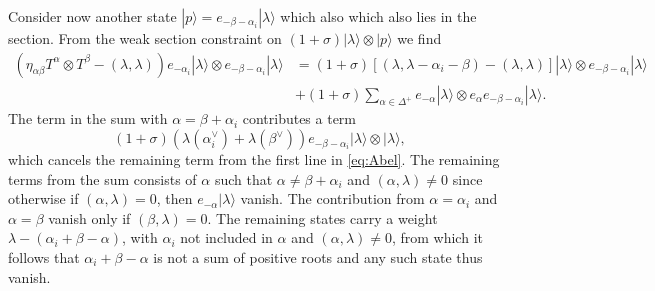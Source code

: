 Consider now another state $|p\rangle = e_{-\beta-\alpha_i}|\lambda\rangle$ which also which also lies in the section. From the weak section constraint on $(1+\sigma)|\lambda\rangle\otimes|p\rangle$ we find 
\begin{equation}\label{eq:Abel}
    \begin{aligned}
        \left(\eta_{\alpha\beta}T^\alpha\otimes T^\beta-(\lambda,\lambda)\right)e_{-\alpha_i}|\lambda\rangle \otimes e_{-\beta-\alpha_i}|\lambda\rangle &= (1+\sigma)\left[(\lambda,\lambda-\alpha_i-\beta)-(\lambda,\lambda)\right]|\lambda\rangle\otimes e_{-\beta-\alpha_i}|\lambda\rangle \\
        &+(1+\sigma)\sum_{\alpha\in \Delta^+}e_{-\alpha}|\lambda\rangle\otimes e_{\alpha}e_{-\beta-\alpha_i}|\lambda\rangle.
    \end{aligned}
\end{equation}
The term in the sum with $\alpha=\beta+\alpha_i$ contributes a term 
\begin{equation}
    (1+\sigma)(\lambda(\alpha_i^\vee)+\lambda(\beta^\vee))e_{-\beta-\alpha_i}|\lambda\rangle\otimes|\lambda\rangle,
\end{equation}
which cancels the remaining term from the first line in \eqref{eq:Abel}. The remaining terms from the sum consists of $\alpha$ such that $\alpha\neq \beta+\alpha_i$ and $(\alpha,\lambda)\neq 0$ since otherwise if $(\alpha,\lambda)=0$, then $e_{-\alpha}|\lambda\rangle$ vanish. The contribution from $\alpha=\alpha_i$ and $\alpha=\beta$ vanish only if $(\beta,\lambda)=0$. The remaining states carry a weight $\lambda-(\alpha_i+\beta-\alpha)$, with $\alpha_i$ not included in $\alpha$ and $(\alpha,\lambda)\neq 0$, from which it follows that $\alpha_i+\beta-\alpha$ is not a sum of positive roots and any such state thus vanish. 

